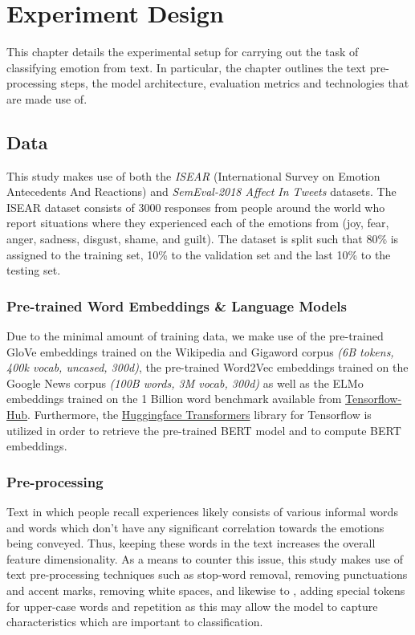 \chapter{Experiment Design}\label{ch:Requirements Analysis}

This chapter details the experimental setup for carrying out the task of classifying emotion from text. In particular, the chapter outlines the text pre-processing steps, the model architecture, evaluation metrics and technologies that are made use of.

\section{Data}

This study makes use of both the \textit{ISEAR} (International Survey on Emotion Antecedents And Reactions) and \textit{SemEval-2018 Affect In Tweets} datasets. The ISEAR dataset consists of 3000 responses from people around the world who report situations where they experienced each of the emotions from (joy, fear, anger, sadness, disgust, shame, and guilt). The dataset is split such that 80\% is assigned to the training set, 10\% to the validation set and the last 10\% to the testing set. 

\subsection{Pre-trained Word Embeddings \& Language Models}

Due to the minimal amount of training data, we make use of the pre-trained GloVe embeddings trained on the Wikipedia and Gigaword corpus \textit{(6B tokens, 400k vocab, uncased, 300d)}, the pre-trained Word2Vec embeddings trained on the Google News corpus \textit{(100B words, 3M vocab, 300d)} as well as the ELMo embeddings trained on the 1 Billion word benchmark available from \href{https://tfhub.dev/}{Tensorflow-Hub}. Furthermore, the \href{https://github.com/huggingface/transformers}{Huggingface Transformers} library for Tensorflow is utilized in order to retrieve the pre-trained BERT model and to compute BERT embeddings. 

\subsection{Pre-processing}

Text in which people recall experiences likely consists of various informal words and words which don't have any significant correlation towards the emotions being conveyed. Thus, keeping these words in the text increases the overall feature dimensionality. As a means to counter this issue, this study makes use of text pre-processing techniques such as stop-word removal, removing punctuations and accent marks, removing white spaces, and likewise to \citep{DBLP:journals/corr/abs-1801-06146}, adding special tokens for upper-case words and repetition as this may allow the model to capture characteristics which are important to classification.

